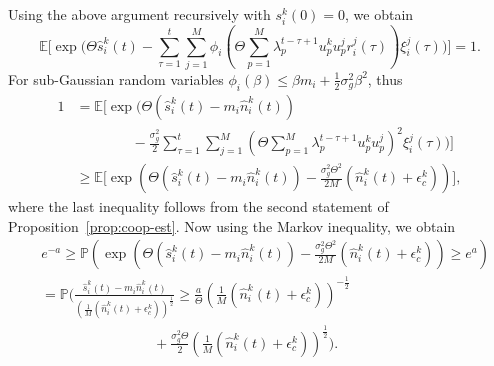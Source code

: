 \documentclass[final,5p,times,twocolumn]{elsarticle}
\theoremstyle{definition}
\newcommand{\expp}[1]{%
	\exp \! \left(#1\right)%
}
\begin{document}
	Using the above argument recursively with $s_i^k(0)=0$, we obtain
		\[
		\mathbb{E} \Bigg[\exp \Bigg( \Theta  \hat{s}_i^k(t)  
		- \sum_{\tau=1}^t \sum_{j=1}^M \phi_i \left(\Theta \sum_{p=1}^M \lambda_p^{t-\tau+1} u_p^k u_p^j r_i^j(\tau) \right) 
		\xi_i^j(\tau) \Bigg ) \Bigg] =1. 
	\]
	For sub-Gaussian random variables $\phi_i(\beta) \leq \beta m_i + \frac{1}{2} \sigma_g^2 \beta^2$, thus
	\begin{align}
		1 &=\mathbb{E} \Bigg [ \! \exp \Bigg( \Theta \!\left(\hat{s}_i^k\!(t) \!-\! m_i \hat{n}_i^k\!(t)\right) \label{eqn:CGF_sub}\\
		& \qquad \qquad - \frac{\sigma_g^2}{2}\! \sum_{\tau=1}^{t} \sum_{j=1}^M \!\left(\! \Theta\! \sum_{p=1}^M \lambda_p^{t-\tau+1} \! u_p^k u_p^j  \right)^2  \! \! \xi_i^j(\tau) \Bigg) \Bigg ] \nonumber \\
		&\ge \mathbb{E} \Bigg [ \expp{ \! \Theta \!\left(\hat{s}_i^k\!(t) \!-\! m_i \hat{n}_i^k\!(t)\right) \!-\! \frac{\sigma_g^2 \Theta^2}{2M} \left(\hat{n}_i^k(t) + \epsilon_c^k \right)}\Bigg ], \nonumber 
	\end{align}
	where the last inequality follows from the second statement of Proposition~\ref{prop:coop-est}. 	
	Now using the Markov inequality, we obtain
	\begin{align}
		&e^{-a} \! \geq \mathbb{P} \! \left( \! \expp{ \! \Theta \!\left(\hat{s}_i^k\!(t) \!-\! m_i \hat{n}_i^k\!(t)\right) \!-\! \frac{\sigma_g^2 \Theta^2}{2M} \left(\hat{n}_i^k(t) + \epsilon_c^k \right)} \! \! \geq \! e^{a} \! \right) \nonumber \\
		&= \mathbb{P} \Bigg( \frac{\hat{s}_i^k(t) - m_i \hat{n}_i^k(t)}{\left( \frac{1}{M}\left(\hat{n}_i^k(t) + \epsilon_c^k \right)  \right)^{\frac{1}{2}}}  \geq  \frac{a}{\Theta} \left( \frac{1}{M}\left(\hat{n}_i^k(t) + \epsilon_c^k \right)  \right)^{-\frac{1}{2}} \nonumber \\
		& \qquad \qquad \qquad \qquad  + \frac{\sigma_g^2 \Theta}{2}\left( \frac{1}{M}\left(\hat{n}_i^k(t) + \epsilon_c^k \right)  \right)^{\frac{1}{2}} \Bigg ).
		\label{FromMarkovIn}
	\end{align}
	
\end{document}
